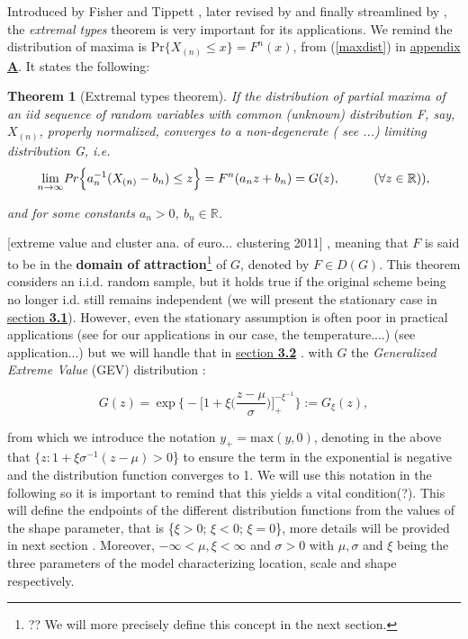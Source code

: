 \documentclass[11pt,a4paper,openany ]{book}
\newtheorem{theorem}{Theorem}[chapter]
\begin{document}
Introduced by Fisher and Tippett \cite{fisher_limiting_1928}, later revised by \cite{gnedenko_sur_1943} and finally streamlined by \cite{De_on_1970}, the \emph{extremal types} theorem is very important for its applications. We remind the distribution of maxima is $\text{Pr}\big\{X_{(n)}\leq x\big\}=F^n(x)$, from (\ref{maxdist}) in \hyperref[appA]{appendix \textbf{A}}. It states the following:

\begin{theorem}[Extremal types theorem] \label{extthm}
	If the distribution of partial maxima of an iid sequence of  random  variables  with  common  (unknown)  distribution F, say, $X_{(n)}$, properly normalized, converges to a non-degenerate ( see ...) limiting distribution G, i.e.
	\begin{equation} \label{exttheom}
	\displaystyle{\lim_{n \to \infty}}\text{\emph{Pr}}\Big\{ a_n^{-1}(X_{(n)}-b_n)\leq z\Big\}=F^n(a_nz+b_n)
	= G(z), \ \ \ \ \ \ \ \ (\forall z\in\mathbb{R})),
	\end{equation}
	
	and for some constants $a_n>0$, $b_n\in\mathbb{R}$.
\end{theorem}
[extreme value and cluster ana. of euro... clustering 2011]
, meaning that $F$ is said to be in the \textbf{domain of attraction}\footnote{?? We will more precisely define this concept in the next section.} of $G$, denoted by $F\in D(G)$.
This theorem considers an i.i.d. random sample, but it holds true if the original scheme 
being no longer i.d. still remains independent (we will present the stationary case in 
\hyperref[statio]{section \textbf{3.1}}). However, even the stationary assumption is often 
poor in practical applications (see for our applications in our case, the temperature....)
\cite{gomes_bootstrap_2015} (see application...) but we will handle that in \hyperref[nstatio]{section \textbf{3.2}} . with $G$ the \textit{Generalized Extreme Value} (GEV) distribution :

\begin{equation} \label{gevgen}
G(z)=\ \text{exp}\ \Bigg\{-\bigg[1+\xi\bigg(\frac{z-\mu}{\sigma}\bigg)\bigg]_+^{-\xi^{-1}}\Bigg\}:=G_{\xi}(z),
\end{equation}

from which we introduce the notation $y_+=\text{max}(y,0)$, denoting in the above that 
$\{z:1+\xi\sigma^{-1}(z-\mu)>0$\} to ensure the term in the exponential is negative and the 
distribution function converges to 1. We will use this notation in the following so it is important to remind that this yields a vital condition(?). This will 
define the endpoints of the different distribution functions from the values of the shape 
parameter, that is \{$\xi>0$; $\xi<0$; $\xi=0$\}, more details will be provided in next 
section . Moreover,  $-\infty<\mu,\xi<\infty$ and $\sigma>0$ with 
$\mu,\sigma$ and $\xi$ being the three parameters of the model characterizing location, 
scale and shape respectively.
\end{document}
